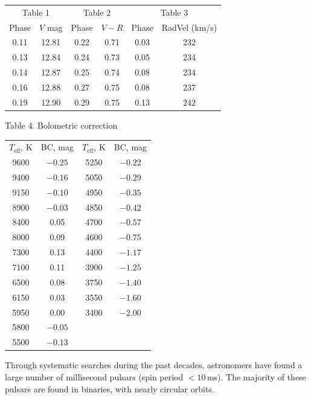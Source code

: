 \begin{center}
\begin{tabular}{cc@{\qquad}cc@{\qquad}cc}
\multicolumn{2}{c}{Table 1} & \multicolumn{2}{c}{Table 2}
  & \multicolumn{2}{c}{Table 3} \\
Phase & $V$ mag & Phase & $V-R$ & Phase & RadVel (km/s) \\
0.11 & 12.81 & 0.22 & 0.71 & 0.03 & 232 \\
0.13 & 12.84 & 0.24 & 0.73 & 0.05 & 234 \\
0.14 & 12.87 & 0.25 & 0.74 & 0.08 & 234 \\
0.16 & 12.88 & 0.27 & 0.75 & 0.08 & 237 \\
0.19 & 12.90 & 0.29 & 0.75 & 0.13 & 242 \\
\end{tabular}
\end{center}

\begin{center}
Table 4. Bolometric correction

\medskip
\begin{tabular}{cc@{\qquad\qquad}cc}
$T_{\mathrm{eff}}$, K & BC, mag & $T_{\mathrm{eff}}$, K & BC, mag \\
9600 & $-0.25$ & 5250 & $-0.22$ \\
9400 & $-0.16$ & 5050 & $-0.29$ \\
9150 & $-0.10$ & 4950 & $-0.35$ \\
8900 & $-0.03$ & 4850 & $-0.42$ \\
8400 & 0.05 & 4700 & $-0.57$ \\
8000 & 0.09 & 4600 & $-0.75$ \\
7300 & 0.13 & 4400 & $-1.17$ \\
7100 & 0.11 & 3900 & $-1.25$ \\
6500 & 0.08 & 3750 & $-1.40$ \\
6150 & 0.03 & 3550 & $-1.60$ \\
5950 & 0.00 & 3400 & $-2.00$ \\
5800 & $-0.05$ & & \\
5500 & $-0.13$ & & \\
\end{tabular}
\end{center}

Through systematic searches during the past decades, astronomers have found a
large number of millisecond pulsars (spin period $< 10$\,ms). The majority of
these pulsars are found in binaries, with nearly circular orbits.

